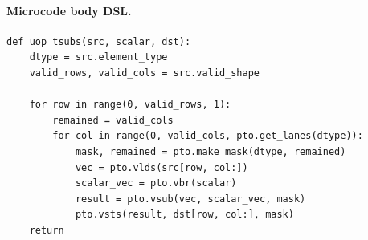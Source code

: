 \paragraph{Microcode body DSL.}
\begin{lstlisting}[style=ptocode]
def uop_tsubs(src, scalar, dst):
    dtype = src.element_type
    valid_rows, valid_cols = src.valid_shape

    for row in range(0, valid_rows, 1):
        remained = valid_cols
        for col in range(0, valid_cols, pto.get_lanes(dtype)):
            mask, remained = pto.make_mask(dtype, remained)
            vec = pto.vlds(src[row, col:])
            scalar_vec = pto.vbr(scalar)
            result = pto.vsub(vec, scalar_vec, mask)
            pto.vsts(result, dst[row, col:], mask)
    return
\end{lstlisting}
\Needspace{0.34\textheight}
